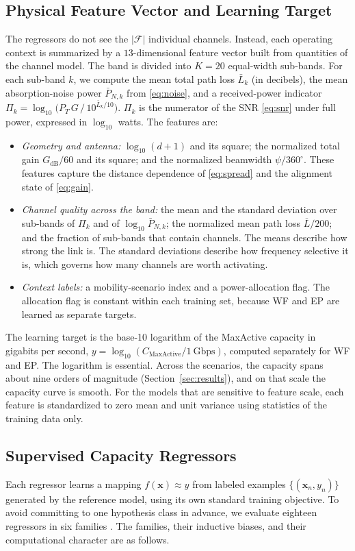 \documentclass[correspondence]{IEEEtaes}
\begin{document}
\subsection{Physical Feature Vector and Learning Target}
\label{sec:features}
The regressors do not see the $|\mathcal{F}|$ individual channels. Instead, each operating
context is summarized by a $13$-dimensional feature vector built from quantities of the
channel model. The band is divided into $K=20$ equal-width sub-bands. For each sub-band
$k$, we compute the mean total path loss $\bar L_k$ (in decibels), the mean
absorption-noise power $\bar P_{N,k}$ from \eqref{eq:noise}, and a received-power indicator
$\Pi_k=\log_{10}\!\big(P_T\,G\,/\,10^{\bar L_k/10}\big)$. $\Pi_k$ is the numerator of the
SNR \eqref{eq:snr} under full power, expressed in $\log_{10}$ watts. The features
are:
\begin{itemize}
\item \emph{Geometry and antenna:} $\log_{10}(d+1)$ and its square; the normalized total
gain $G_{\mathrm{dB}}/60$ and its square; and the normalized beamwidth $\psi/360^\circ$.
These features capture the distance dependence of \eqref{eq:spread} and the alignment
state of \eqref{eq:gain}.
\item \emph{Channel quality across the band:} the mean and the standard deviation over
sub-bands of $\Pi_k$ and of $\log_{10}\bar P_{N,k}$; the normalized mean path loss
$\overline{L}/200$; and the fraction of sub-bands that contain channels. The means
describe how strong the link is. The standard deviations describe how frequency
selective it is, which governs how many channels are worth activating.
\item \emph{Context labels:} a mobility-scenario index and a power-allocation flag. The
allocation flag is constant within each training set, because WF and EP are learned as
separate targets.
\end{itemize}
The learning target is the base-10 logarithm of the MaxActive capacity in gigabits per
second, $y=\log_{10}(C_{\text{MaxActive}}/1~\text{Gbps})$, computed separately for WF and
EP. The logarithm is essential. Across the scenarios, the capacity spans about nine
orders of magnitude (Section~\ref{sec:results}), and on that scale the capacity curve is
smooth. For the models that are sensitive to feature scale, each feature is standardized
to zero mean and unit variance using statistics of the training data only.

\subsection{Supervised Capacity Regressors}
\label{sec:regressors}
Each regressor learns a mapping $f(\mathbf{x})\approx y$ from labeled examples
$\{(\mathbf{x}_n,y_n)\}$ generated by the reference model, using its own standard training
objective. To avoid committing to one hypothesis class in advance, we evaluate eighteen
regressors in six families \cite{pedregosa2011sklearn,chen2016xgboost}. The families,
their inductive biases, and their computational character are as follows.
\end{document}
